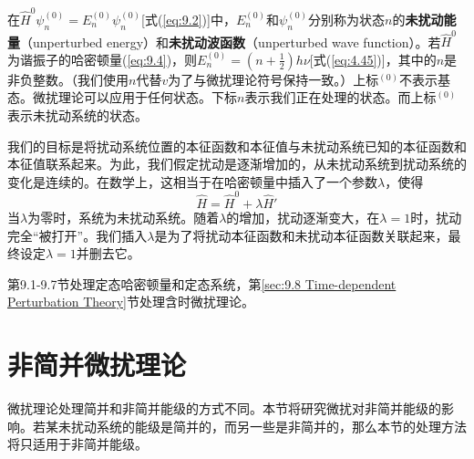     在$\hat{H}^0 \psi_n^{\left(0\right)} = E_n^{\left(0\right)} \psi_n^{\left(0\right)}$[式(\ref{eq:9.2})]中，$E_n^{\left(0\right)}$和$\psi_n^{\left(0\right)}$分别称为状态$n$的\textbf{未扰动能量}（unperturbed energy）和\textbf{未扰动波函数}（unperturbed wave function）。若$\hat{H}^0$为谐振子的哈密顿量(\ref{eq:9.4})，则$E_n^{\left(0\right)} = \left(n + \frac{1}{2}\right)h\nu$[式(\ref{eq:4.45})]，其中的$n$是非负整数。（我们使用$n$代替$v$为了与微扰理论符号保持一致。）上标$^{(0)}$不表示基态。微扰理论可以应用于任何状态。下标$n$表示我们正在处理的状态。而上标$^{(0)}$表示未扰动系统的状态。

    我们的目标是将扰动系统位置的本征函数和本征值与未扰动系统已知的本征函数和本征值联系起来。为此，我们假定扰动是逐渐增加的，从未扰动系统到扰动系统的变化是连续的。在数学上，这相当于在哈密顿量中插入了一个参数$\lambda$，使得
    \begin{equation}
        \hat{H} = \hat{H}^0 + \lambda \hat{H}'
        \label{eq:9.7}
    \end{equation}
    当$\lambda$为零时，系统为未扰动系统。随着$\lambda$的增加，扰动逐渐变大，在$\lambda=1$时，扰动完全“被打开”。我们插入$\lambda$是为了将扰动本征函数和未扰动本征函数关联起来，最终设定$\lambda=1$并删去它。

    第9.1-9.7节处理定态哈密顿量和定态系统，第\ref{sec:9.8 Time-dependent Perturbation Theory}节处理含时微扰理论。

\section{非简并微扰理论}
\label{sec:9.2 Nondegenerate Perturbation Theory}
    微扰理论处理简并和非简并能级的方式不同。本节将研究微扰对非简并能级的影响。若某未扰动系统的能级是简并的，而另一些是非简并的，那么本节的处理方法将只适用于非简并能级。

